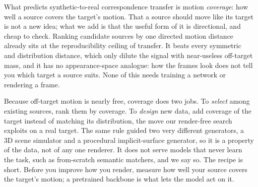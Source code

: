 \documentclass[runningheads]{llncs}
\begin{document}
What predicts synthetic-to-real correspondence transfer is motion
\emph{coverage}: how well a source covers the target's motion. That a source
should move like its target is not a new idea; what we add is that the useful
form of it is directional, and cheap to check. Ranking candidate sources by one
directed motion distance already sits at the reproducibility ceiling of transfer.
It beats every symmetric and distribution distance, which only dilute the signal
with near-useless off-target mass, and it has no appearance-space analogue: how
the frames look does not tell you which target a source suits. None of this needs
training a network or rendering a frame.

Because off-target motion is nearly free, coverage does two jobs. To
\emph{select} among existing sources, rank them by coverage. To \emph{design} new
data, add coverage of the target instead of matching its distribution, the move
our render-free search exploits on a real target. The same rule guided two very
different generators, a 3D scene simulator and a procedural implicit-surface
generator, so it is a property of the data, not of any one renderer. It does not
serve models that never learn the task, such as from-scratch semantic matchers,
and we say so. The recipe is short. Before you improve how you render, measure
how well your source covers the target's motion; a pretrained backbone is what
lets the model act on it.



\end{document}
